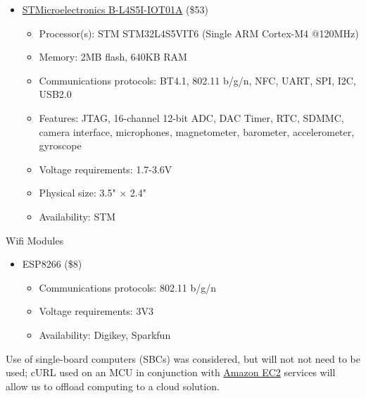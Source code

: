 \begin{flushleft}
\begin{itemize}
        \item
        \href{https://www.st.com/en/evaluation-tools/b-l4s5i-iot01a.html}{STMicroelectronics 
        B-L4S5I-IOT01A} (\$53)
        \begin{itemize}
            \item Processor(s): STM STM32L4S5VIT6 (Single ARM Cortex-M4 @120MHz) 
            \item Memory: 2MB flash, 640KB RAM
            \item Communications protocols: BT4.1, 802.11 b/g/n, NFC, UART, SPI, I2C, USB2.0
            \item Features: JTAG, 16-channel 12-bit ADC, DAC Timer, RTC, SDMMC, camera interface,
            microphones, magnetometer, barometer, accelerometer, gyroscope
            \item Voltage requirements: 1.7-3.6V
            \item Physical size: 3.5" $\times$ 2.4"
            \item Availability: STM
        \end{itemize}
    \end{itemize}
\end{flushleft}
\begin{flushleft}
    Wifi Modules
    \begin{itemize}
        \item ESP8266 (\$8)
        \begin{itemize}
            \item Communications protocols: 802.11 b/g/n
            \item Voltage requirements: 3V3
            \item Availability: Digikey, Sparkfun
        \end{itemize}
    \end{itemize}
\end{flushleft}
\begin{flushleft}
    Use of single-board computers (SBCs) was considered, but will not not need to be used; cURL 
    used on an MCU in conjunction with \href{https://aws.amazon.com/ec2/}{Amazon EC2} services will
    allow us to offload computing to a cloud solution.
\end{flushleft}

